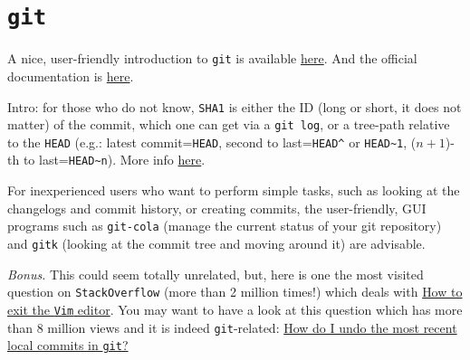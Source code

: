 \documentclass[a4paper,12pt,%
              final%
              ]{article}
\begin{document}
\section{\texttt{git}}
\label{sec:git}
A nice, user-friendly introduction to \texttt{git} is available \href{https://www.atlassian.com/git/tutorials/learn-git-with-bitbucket-cloud}{here}. And the official documentation is \href{https://git-scm.com/doc}{here}.

Intro: for those who do not know, \texttt{SHA1} is either the ID (long or short, it does not matter) of the commit, which one can get via a \texttt{git log}, or a tree-path relative to the \texttt{HEAD} (e.g.: latest commit=\texttt{HEAD}, second to last=\verb|HEAD^| or \verb|HEAD~1|, ($n+1$)-th to last=\verb|HEAD~n|). More info \href{https://git-scm.com/docs/git-cherry-pick}{here}.

For inexperienced users who want to perform simple tasks, such as looking at the changelogs and commit history, or creating commits, the user-friendly, GUI programs such as \texttt{git-cola} (manage the current status of your git repository) and \texttt{gitk} (looking at the commit tree and moving around it) are advisable.

\emph{Bonus.} This could seem totally unrelated, but, here is one the most visited question on \texttt{StackOverflow} (more than 2 million times!) which deals with \href{https://stackoverflow.com/questions/11828270/how-do-i-exit-the-vim-editor}{How to exit the \texttt{Vim} editor}. You may want to have a look at this question which has more than 8 million views and it is indeed \texttt{git}-related: \href{https://stackoverflow.com/questions/927358/how-do-i-undo-the-most-recent-local-commits-in-git}{How do I undo the most recent local commits in \texttt{git}?}
\end{document}
